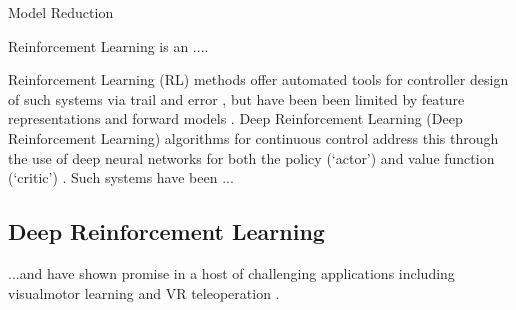 \documentclass[letterpaper, 10 pt, conference]{ieeeconf}
\begin{document}








{Model Reduction}






Reinforcement Learning is an ....  

Reinforcement Learning (RL) methods offer automated tools for controller design of such systems via trail and error \cite{sutton1998reinforcement}, but have been been limited by feature representations and forward models \cite{duan2016benchmarking}.
Deep Reinforcement Learning (Deep Reinforcement Learning) algorithms for continuous control address this through the use of deep neural networks for both the policy (`actor') and value function (`critic') \cite{DDPG, SAC}.
Such systems have been  ...

\subsection{Deep Reinforcement Learning}

...and have shown promise in a host of challenging applications including visualmotor learning \cite{finn2016deep} and VR teleoperation \cite{zhang2018deep}. 



\end{document}
